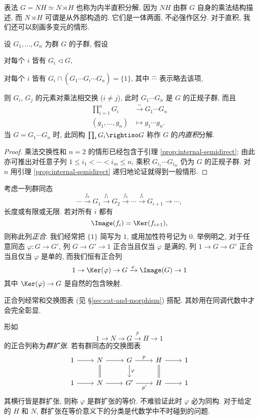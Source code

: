 表法 $G = NH \simeq N \rtimes H$ 也称为内半直积分解, 因为 $NH$ 由群 $G$ 自身的乘法结构描述, 而 $N \rtimes H$ 可谓是从外部构造的. 它们是一体两面, 不必强作区分. 对于直积, 我们还可以刻画多变元的情形.
\begin{lemma}\label{prop:internal-direct}
	设 $G_1, \ldots, G_n$ 为群 $G$ 的子群, 假设
	\begin{compactitem}
		\item 对每个 $i$ 皆有 $G_i \lhd G$,
		\item 对每个 $i$ 皆有 $G_i \cap (G_1 \cdots \widehat{G_i} \cdots G_n) = \{1\}$, 其中 $\widehat{\cdots}$ 表示略去该项,
	\end{compactitem}
	则 $G_i$, $G_j$ 的元素对乘法相交换 ($i \neq j$), 此时 $G_1 \cdots G_n$ 是 $G$ 的正规子群, 而且
	\begin{align*}
		\prod_{i=1}^n G_i & \stackrel{\sim}{\longrightarrow} G_1 \cdots G_n \\
		(g_1, \ldots, g_n) & \longmapsto g_1 \cdots g_n.
	\end{align*}
	 当 $G = G_1 \cdots G_n$ 时, 此同构 $\prod_i G_i \rightiso G$ 称作 $G$ 的\emph{内直积}分解.
\end{lemma}
\begin{proof}
	乘法交换性和 $n=2$ 的情形已经包含于引理 \ref{prop:internal-semidirect}; 由此亦可推出对任意子列 $1 \leq i_1 < \cdots < i_m \leq n$, 乘积 $G_{i_1} \cdots G_{i_m}$ 仍为 $G$ 的正规子群. 对 $n$ 用引理 \ref{prop:internal-semidirect} 递归地论证就得到一般情形.
\end{proof}

\begin{definition}[正合列] \label{def:exact-seq-group}
	考虑一列群同态
	\[ \cdots \xrightarrow{f_0} G_1 \xrightarrow{f_1} G_2 \xrightarrow{f_2} \cdots \xrightarrow{f_i} G_{i+1} \to \cdots, \]
	长度或有限或无限. 若对所有 $i$ 都有
	\[ \Image(f_i) = \Ker(f_{i+1}), \]
	则称此列\emph{正合}. 我们经常把 $\{1\}$ 简写为 $1$, 或用加性符号记为 $0$. 举例明之, 对于任意同态 $\varphi: G \to G'$, 列 $G \to G' \to 1$ 正合当且仅当 $\varphi$ 是满的, 列 $1 \to G \to G'$ 正合当且仅当 $\varphi$ 是单的, 而我们恒有正合列
	\[ 1 \to \Ker(\varphi) \to G \xrightarrow{\varphi} \Image(G)  \to 1 \]
	其中 $\Ker(\varphi) \to G$ 是自然的包含映射.
\end{definition}
正合列经常和交换图表 (见 \S\ref{sec:cat-and-morphism}) 搭配. 其妙用在同调代数中才会完全彰显.

形如
\[ 1 \to N \to G \xrightarrow{p} H \to 1 \]
的正合列称为\emph{群扩张}. 若有群同态的交换图表
\[\begin{tikzcd}
	1 \arrow[r] & N \arrow[r] \arrow[equal, d] & G \arrow[r, "p"] \arrow[d, "\varphi"] & H \arrow[equal, d] \arrow[r] & 1 \\
	1 \arrow[r] & N \arrow[r] & G' \arrow[r, "{p'}"'] & H \arrow[r] & 1
\end{tikzcd}\]
其横行皆是群扩张, 则称 $\varphi$ 是群扩张的等价. 不难验证此时 $\varphi$ 必为同构. 对于给定的 $H$ 和 $N$, 群扩张在等价意义下的分类是代数学中不时碰到的问题.

